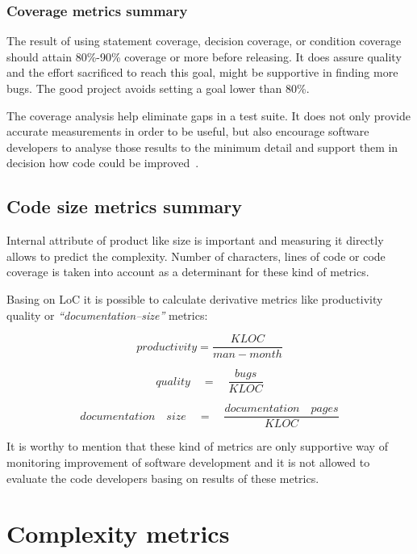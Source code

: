 \subsubsection{Coverage metrics summary}
The result of using statement coverage, decision coverage, or condition coverage should attain 80\%-90\% coverage or more before releasing. It does assure quality and the effort sacrificed to reach this goal, might be supportive in finding more bugs. The good project avoids setting a goal lower than 80\%.

The coverage analysis help eliminate gaps in a test suite. It does not only provide accurate measurements in order to be useful, but also encourage software developers to analyse those results to the minimum detail and support them in decision how code could be improved~\cite{coverage1,coverage2}.

\subsection{Code size metrics summary}
Internal attribute of product like size is important and measuring it directly allows to predict the complexity. Number of characters, lines of code or code coverage is taken into account as a determinant for these kind of metrics.  

Basing on \ac{LoC} it is possible to calculate derivative metrics like productivity quality or \textit{``documentation--size''} metrics: 

\begin{equation}
productivity=\frac { KLOC }{ man-month } 
\end{equation}
 
 \begin{equation}
quality\quad =\quad \frac { bugs }{ KLOC } 
\end{equation}

\begin{equation}
documentation\quad size\quad =\quad \frac{documentation\quad pages }{KLOC} 
\end{equation}

It is worthy to mention that these kind of metrics are only supportive way of monitoring improvement of software development and it is not allowed to evaluate the code developers basing on results of these metrics. 

\section{Complexity metrics}

